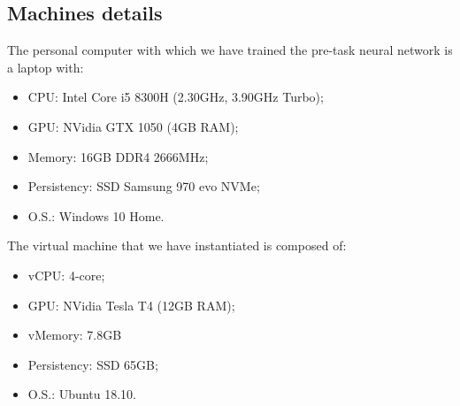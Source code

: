 \subsection{Machines details}\label{ss:machines}
The personal computer with which we have trained the pre-task neural network is a laptop with:
\begin{itemize}
    \item CPU: Intel Core i5 8300H (2.30GHz, 3.90GHz Turbo);
    \item GPU: NVidia GTX 1050 (4GB RAM);
    \item Memory: 16GB DDR4 2666MHz;
    \item Persistency: SSD Samsung 970 evo NVMe;
    \item O.S.: Windows 10 Home.
\end{itemize}
The virtual machine that we have instantiated is composed of:
\begin{itemize}
    \item vCPU: 4-core;
    \item GPU: NVidia Tesla T4 (12GB RAM);
    \item vMemory: 7.8GB
    \item Persistency: SSD 65GB;
    \item O.S.: Ubuntu 18.10.
\end{itemize}


